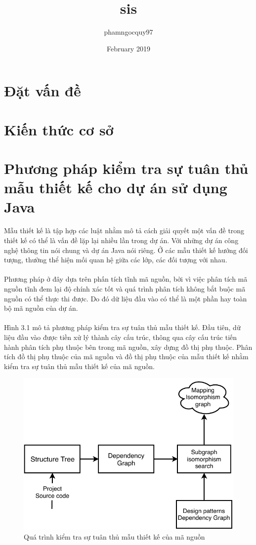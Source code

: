 \documentclass[12pt]{report}
\title{sis}
\author{phamngocquy97 }
\date{February 2019}
\begin{document}
	
\newpage
{}
\setcounter{page}{1}
\chapter{Đặt vấn đề}
\chapter{Kiến thức cơ sở}
\chapter{Phương pháp kiểm tra sự tuân thủ mẫu thiết kế cho dự án sử dụng Java}
\newpage
Mẫu thiết kế là tập hợp các luật nhằm mô tả cách giải quyết một vấn đề trong thiết kế có thể là vấn đề lặp lại nhiều lần trong dự án. Với những dự án công nghệ thông tin nói chung và dự án Java nói riêng. Ở các mẫu thiết kế hướng đối tượng, thường thể hiện mối quan hệ giữa các lớp, các đối tượng với nhau. \\\\
Phương pháp ở đây dựa trên phấn tích tĩnh mã nguồn, bởi vì việc phân tích mã nguồn tĩnh đem lại độ chính xác tốt và quá trình phân tích không bắt buộc mã nguồn có thể thực thi được. Do đó dữ liệu đầu vào có thể là một phần hay toàn bộ mã nguồn của dự án.\\\\
Hình 3.1 mô tả phương pháp kiểm tra sự tuân thủ mẫu thiết kế. Đầu tiên, dữ liệu đầu vào được tiền xử lý thành cây cấu trúc, thông qua cây cấu trúc tiến hành phân tích phụ thuộc bên trong mã nguồn, xây dựng đồ thị phụ thuộc. Phân tích đồ thị phụ thuộc của mã nguồn và đồ thị phụ thuộc của mẫu thiết kế  nhằm kiểm tra sự tuân thủ mẫu thiết kế của mã nguồn.
\begin{figure}[h]
	\centering
	\includegraphics[scale=0.36]{images/general_architecture_3_1}
	\caption{Quá trình kiểm tra sự tuân thủ mẫu thiết kế của mã nguồn}
	\label{fig:general_architecture}
\end{figure}
\end{document}
